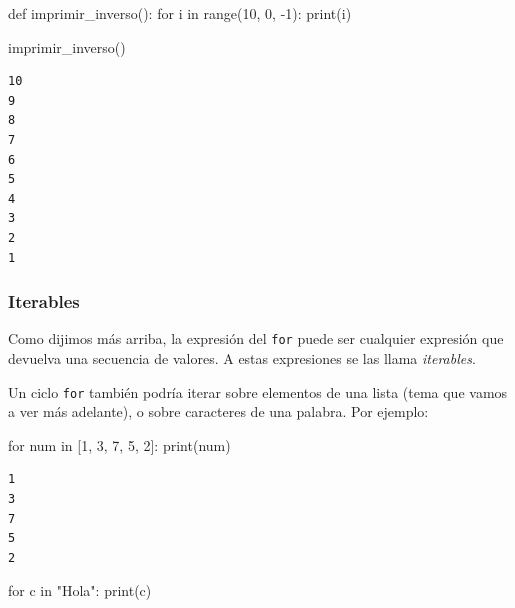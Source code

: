 \documentclass[
  letterpaper,
  DIV=11,
  numbers=noendperiod]{scrreprt}
\newenvironment{Shaded}{\begin{snugshade}}{\end{snugshade}}
\newcommand{\BuiltInTok}[1]{\textcolor[rgb]{0.00,0.23,0.31}{#1}}
\newcommand{\ControlFlowTok}[1]{\textcolor[rgb]{0.00,0.23,0.31}{#1}}
\newcommand{\DecValTok}[1]{\textcolor[rgb]{0.68,0.00,0.00}{#1}}
\newcommand{\KeywordTok}[1]{\textcolor[rgb]{0.00,0.23,0.31}{#1}}
\newcommand{\NormalTok}[1]{\textcolor[rgb]{0.00,0.23,0.31}{#1}}
\newcommand{\OperatorTok}[1]{\textcolor[rgb]{0.37,0.37,0.37}{#1}}
\newcommand{\StringTok}[1]{\textcolor[rgb]{0.13,0.47,0.30}{#1}}
\begin{document}
\begin{Shaded}
\begin{Highlighting}[]
\KeywordTok{def}\NormalTok{ imprimir\_inverso():}
  \ControlFlowTok{for}\NormalTok{ i }\KeywordTok{in} \BuiltInTok{range}\NormalTok{(}\DecValTok{10}\NormalTok{, }\DecValTok{0}\NormalTok{, }\OperatorTok{{-}}\DecValTok{1}\NormalTok{):}
      \BuiltInTok{print}\NormalTok{(i)}

\NormalTok{imprimir\_inverso()}
\end{Highlighting}
\end{Shaded}

\begin{verbatim}
10
9
8
7
6
5
4
3
2
1
\end{verbatim}

\hfill\break

\hypertarget{iterables}{%
\subsubsection{Iterables}\label{iterables}}

Como dijimos más arriba, la expresión del \texttt{for} puede ser
cualquier expresión que devuelva una secuencia de valores. A estas
expresiones se las llama \emph{iterables}.

Un ciclo \texttt{for} también podría iterar sobre elementos de una lista
(tema que vamos a ver más adelante), o sobre caracteres de una palabra.
Por ejemplo:

\begin{Shaded}
\begin{Highlighting}[]
\ControlFlowTok{for}\NormalTok{ num }\KeywordTok{in}\NormalTok{ [}\DecValTok{1}\NormalTok{, }\DecValTok{3}\NormalTok{, }\DecValTok{7}\NormalTok{, }\DecValTok{5}\NormalTok{, }\DecValTok{2}\NormalTok{]:}
    \BuiltInTok{print}\NormalTok{(num)}
\end{Highlighting}
\end{Shaded}

\begin{verbatim}
1
3
7
5
2
\end{verbatim}

\begin{Shaded}
\begin{Highlighting}[]
\ControlFlowTok{for}\NormalTok{ c }\KeywordTok{in} \StringTok{"Hola"}\NormalTok{:}
    \BuiltInTok{print}\NormalTok{(c)}
\end{Highlighting}
\end{Shaded}
\end{document}
